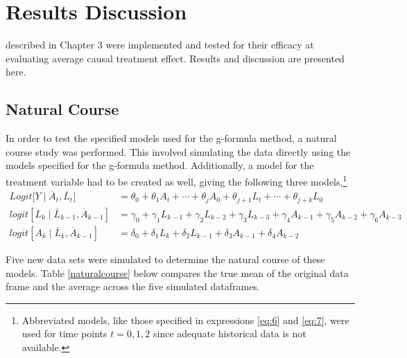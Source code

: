 
\chapter{Results Discussion}

 described in Chapter 3 were implemented and tested for their efficacy at evaluating average causal treatment effect.  Results and discussion are presented here.  

\section{Natural Course} 
In order to test the specified models used for the g-formula method, a natural course study was performed.  This involved simulating the data directly using the models specified for the g-formula method.  Additionally, a model for the treatment variable had to be created as well, giving the following three models,\footnote{Abbreviated models, like those specified in expressions \ref{eq:6} and \ref{eq:7}, were used for time points $t=0,1,2$ since adequate historical data is not available.} 
\begin{align} 
Logit \big[Y \mid \overline{A}_t, \overline{L}_t \big] &= \theta_{0} + \theta_1 A_{t} + \cdots + \theta_j A_0 + \theta_{j+1} L_t + \cdots + \theta_{j+k} L_0  \\ 
logit[L_k \mid \overline{L}_{k-1}, \overline{A}_{k-1}] &= \gamma_0 + \gamma_1 L_{k-1} + \gamma_2 L_{k-2} + \gamma_3 L_{k-3}  + \gamma_4 A_{k-1} + \gamma_5 A_{k-2} + \gamma_6 A_{k-3} \\ 
logit[A_k \mid \overline{L}_{k}, \overline{A}_{k-1}] &= \delta_0 + \delta_1 L_{k} + \delta_2 L_{k-1} + \delta_3 A_{k-1} + \delta_4 A_{k-2} 
\end{align} 

Five new data sets were simulated to determine the natural course of these models.  Table \ref{naturalcourse} below compares the true mean of the original data frame and the average across the five simulated dataframes.  


